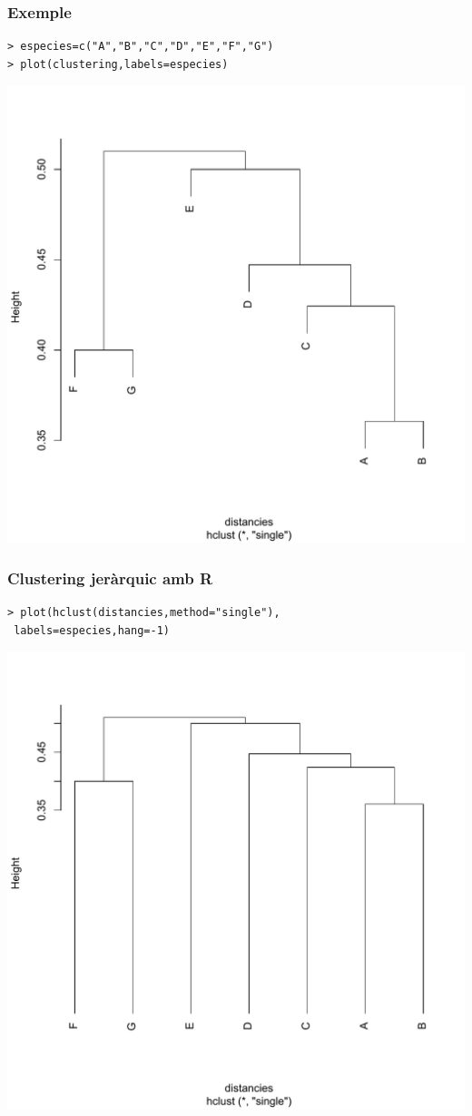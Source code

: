 \documentclass[12pt,t]{beamer}
\theoremstyle{plain}
\theoremstyle{definition}
\begin{document}
\begin{frame}[fragile]
\frametitle{Exemple}

\begin{verbatim}
> especies=c("A","B","C","D","E","F","G")
> plot(clustering,labels=especies)
\end{verbatim}
\vspace*{-3ex}

\begin{center}
\includegraphics[width=0.7\linewidth]{Rplot1.pdf}
\end{center}
\end{frame}

\begin{frame}[fragile]
\frametitle{Clustering jeràrquic amb R}

\begin{verbatim}
> plot(hclust(distancies,method="single"),
 labels=especies,hang=-1)
\end{verbatim}
\begin{center}
\includegraphics[width=0.7\linewidth]{Rplot2.pdf}
\end{center}
\end{frame}
\end{document}
